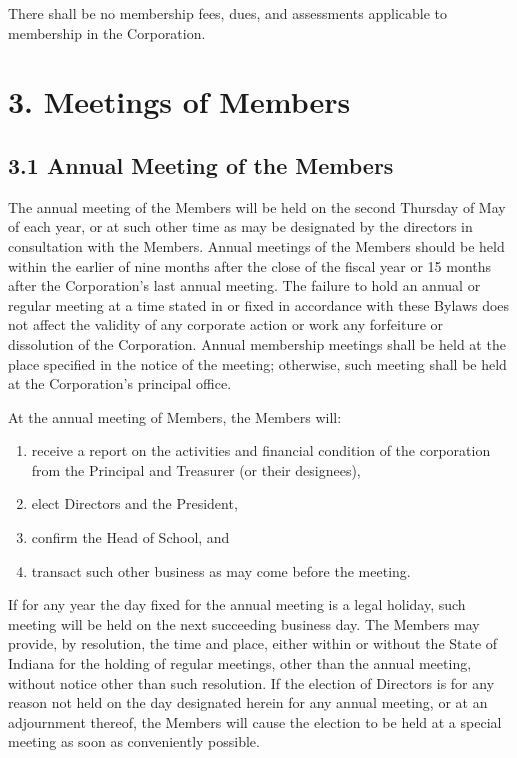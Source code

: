 \documentclass[
]{book}
\begin{document}
There shall be no membership fees, dues, and assessments applicable to
membership in the Corporation.

\section{3. Meetings of Members}\label{meetings-of-members}

\subsection{3.1 Annual Meeting of the Members}\label{annual-meeting-of-the-members}

The annual meeting of the Members will be held on the second Thursday
of May of each year, or at such other time as may be designated by the
directors in consultation with the Members. Annual meetings of the
Members should be held within the earlier of nine months after the
close of the fiscal year or 15 months after the Corporation's last
annual meeting. The failure to hold an annual or regular meeting at a
time stated in or fixed in accordance with these Bylaws does not
affect the validity of any corporate action or work any forfeiture or
dissolution of the Corporation. Annual membership meetings shall be
held at the place specified in the notice of the meeting; otherwise,
such meeting shall be held at the Corporation's principal office.

At the annual meeting of Members, the Members will:

\begin{enumerate}
\def\labelenumi{\alph{enumi})}
\item
  receive a report on the activities and financial condition of the
  corporation from the Principal and Treasurer (or their designees),
\item
  elect Directors and the President,
\item
  confirm the Head of School, and
\item
  transact such other business as may come before the meeting.
\end{enumerate}

If for any year the day fixed for the annual meeting is a legal
holiday, such meeting will be held on the next succeeding business
day. The Members may provide, by resolution, the time and place,
either within or without the State of Indiana for the holding of
regular meetings, other than the annual meeting, without notice other
than such resolution. If the election of Directors is for any reason
not held on the day designated herein for any annual meeting, or at an
adjournment thereof, the Members will cause the election to be held at
a special meeting as soon as conveniently possible.
\end{document}

